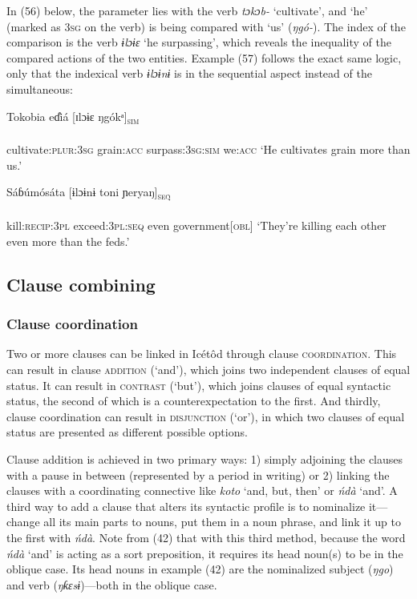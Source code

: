 In (56) below, the parameter lies with the verb \textit{tɔkɔb-} ‘cultivate’, and ‘he’ (marked as 3\textsc{sg} on the verb) is being compared with ‘us’ (\textit{ŋgó-}). The index of the comparison is the verb \textit{ɨlɔɨɛ} ‘he surpassing’, which reveals the inequality of the compared actions of the two entities. Example (57) follows the exact same logic, only that the indexical verb \textit{ɨlɔɨnɨ} is in the sequential aspect instead of the simultaneous: 



\ea\label{ex:}
\gll Tokobia     eɗi̊á        [ɪlɔɨɛ     ŋgókᵃ]\textsc{\textsubscript{sim}} \\
    \\
cultivate:\textsc{plur:3sg} grain:\textsc{acc} surpass:\textsc{3sg:sim} we:\textsc{acc}
\glt ‘He cultivates grain more than us.’ 
\z




\ea\label{ex:}
\gll Sáɓúmósáta     [ɨlɔɨnɨ          toni  ɲeryaŋ]\textsc{\textsubscript{seq}} \\
    \\
kill:\textsc{recip:3pl} exceed:\textsc{3pl:seq} even government[\textsc{obl}]
\glt ‘They’re killing each other even more than the feds.’ 
\z






\subsection{Clause combining}
\subsubsection{Clause coordination}

Two or more clauses can be linked in Icétôd through clause \textsc{coordination}. This can result in clause \textsc{addition} (‘and’), which joins two independent clauses of equal status. It can result in \textsc{contrast} (‘but’), which joins clauses of equal syntactic status, the second of which is a counterexpectation to the first. And thirdly, clause coordination can result in \textsc{disjunction} (‘or’), in which two clauses of equal status are presented as different possible options.

Clause addition is achieved in two primary ways: 1) simply adjoining the clauses with a pause in between (represented by a period in writing) or 2) linking the clauses with a coordinating connective like \textit{koto} ‘and, but, then’ or \textit{ńdà} ‘and’. A third way to add a clause that alters its syntactic profile is to nominalize it—change all its main parts to nouns, put them in a noun phrase, and link it up to the first with \textit{ńdà}. Note from (42) that with this third method, because the word \textit{ńdà} ‘and’ is acting as a sort preposition, it requires its head noun(s) to be in the oblique case. Its head nouns in example (42) are the nominalized subject (\textit{ŋgo}) and verb (\textit{ŋƙɛsɨ})—both in the oblique case.

